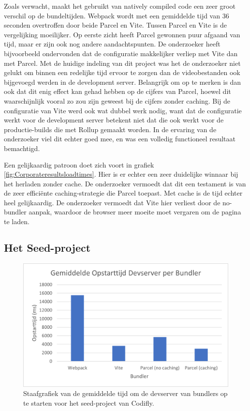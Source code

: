 Zoals verwacht, maakt het gebruikt van natively compiled code een zeer groot verschil op de bundeltijden. Webpack wordt met een gemiddelde tijd van 36 seconden overtroffen door beide Parcel en Vite. Tussen Parcel en Vite is de vergelijking moeilijker. Op eerste zicht heeft Parcel gewonnen puur afgaand van tijd, maar er zijn ook nog andere aandachtspunten. De onderzoeker heeft bijvoorbeeld ondervonden dat de configuratie makkelijker verliep met Vite dan met Parcel. Met de huidige indeling van dit project was het de onderzoeker niet gelukt om binnen een redelijke tijd ervoor te zorgen dan de videobestanden ook bijgevoegd werden in de development server. Belangrijk om op te merken is dan ook dat dit enig effect kan gehad hebben op de cijfers van Parcel, hoewel dit waarschijnlijk vooral zo zou zijn geweest bij de cijfers zonder caching. Bij de configuratie van Vite werd ook wat dubbel werk nodig, want dat de configuratie werkt voor de development server betekent niet dat die ook werkt voor de productie-builds die met Rollup gemaakt worden. In de ervaring van de onderzoeker viel dit echter goed mee, en was een volledig functioneel resultaat bemachtigd.

Een gelijkaardig patroon doet zich voort in grafiek \ref{fig:Corporateresultsloadtimes}. Hier is er echter een zeer duidelijke winnaar bij het herladen zonder cache. De onderzoeker vermoedt dat dit een testament is van de zeer efficiënte caching-strategie die Parcel toepast.
Met cache is de tijd echter heel gelijkaardig. De onderzoeker vermoedt dat Vite hier verliest door de no-bundler aanpak, waardoor de browser meer moeite moet vergaren om de pagina te laden.

\subsection{Het Seed-project}

\begin{figure}[!htp]
  \includegraphics[width=\linewidth]{bachproef/img/results-seed.png}
  \caption{Staafgrafiek van de gemiddelde tijd om de devserver van bundlers op te starten voor het seed-project van Codifly.}
  \label{fig:Seedresults}
\end{figure}

